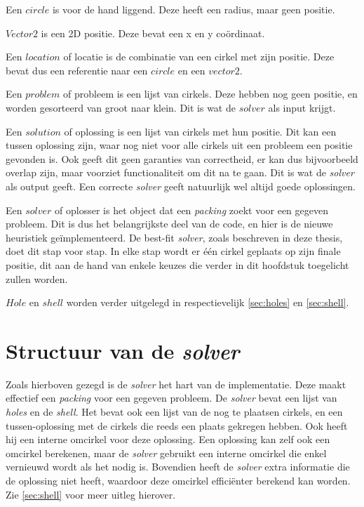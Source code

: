 \documentclass[12pt,a4paper,oneside]{book}
\begin{document}
Een $circle$ is voor de hand liggend. Deze heeft een radius, maar geen positie.

$Vector2$ is een 2D positie. Deze bevat een x en y coördinaat.

Een $location$ of locatie is de combinatie van een cirkel met zijn positie. Deze bevat dus een referentie naar een $circle$ en een $vector2$.

Een $problem$ of probleem is een lijst van cirkels.
Deze hebben nog geen positie, en worden gesorteerd van groot naar klein.
Dit is wat de $solver$ als input krijgt.

Een $solution$ of oplossing is een lijst van cirkels met hun positie.
Dit kan een tussen oplossing zijn, waar nog niet voor alle cirkels uit een probleem een positie gevonden is.
Ook geeft dit geen garanties van correctheid, er kan dus bijvoorbeeld overlap zijn, maar voorziet functionaliteit om dit na te gaan.
Dit is wat de \textit{solver} als output geeft.
Een correcte \textit{solver} geeft natuurlijk wel altijd goede oplossingen.

Een $solver$ of oplosser is het object dat een \textit{packing} zoekt voor een gegeven probleem.
Dit is dus het belangrijkste deel van de code, en hier is de nieuwe heuristiek geïmplementeerd.
De best-fit \textit{solver}, zoals beschreven in deze thesis, doet dit stap voor stap.
In elke stap wordt er één cirkel geplaats op zijn finale positie, dit aan de hand van enkele keuzes die verder in dit hoofdstuk toegelicht zullen worden.

$Hole$ en $shell$ worden verder uitgelegd in respectievelijk \autoref{sec:holes} en \autoref{sec:shell}.

\section{Structuur van de \textit{solver}}

Zoals hierboven gezegd is de \textit{solver} het hart van de implementatie.
Deze maakt effectief een \textit{packing} voor een gegeven probleem.
De \textit{solver} bevat een lijst van \textit{holes} en de \textit{shell}.
Het bevat ook een lijst van de nog te plaatsen cirkels, en een tussen-oplossing met de cirkels die reeds een plaats gekregen hebben.
Ook heeft hij een interne omcirkel voor deze oplossing.
Een oplossing kan zelf ook een omcirkel berekenen, maar de \textit{solver} gebruikt een interne omcirkel die enkel vernieuwd wordt als het nodig is.
Bovendien heeft de \textit{solver} extra informatie die de oplossing niet heeft, waardoor deze omcirkel efficiënter berekend kan worden.
Zie \autoref{sec:shell} voor meer uitleg hierover.
\end{document}
